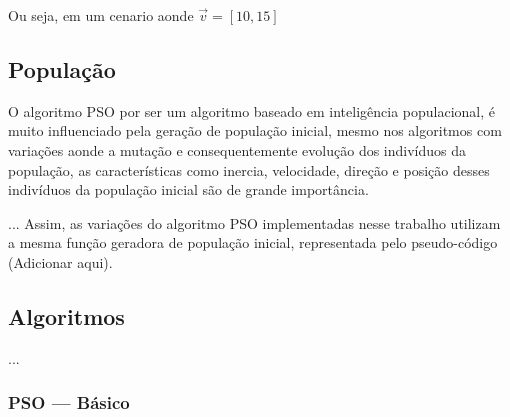                 \noident Ou seja, em um cenario aonde $\vec v=[10, 15]$ 
                







    \subsection{População}
        O algoritmo PSO por ser um algoritmo baseado em inteligência populacional, é muito influenciado pela geração de população inicial, mesmo nos algoritmos com variações aonde a mutação e consequentemente evolução dos indivíduos da população, as características como inercia, velocidade, direção e posição desses indivíduos da população inicial são de grande importância.\newline


        

        ...
        Assim, as variações do algoritmo PSO implementadas nesse trabalho utilizam a mesma função geradora de população inicial, representada pelo pseudo-código   (Adicionar aqui).


    \subsection{Algoritmos}
            ...

        \subsubsection{PSO — Básico}

